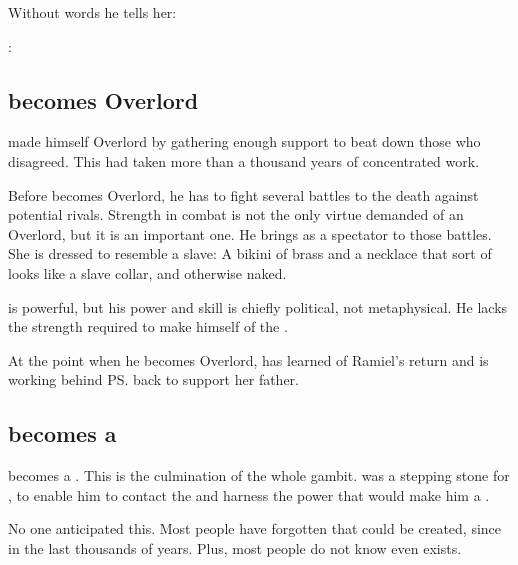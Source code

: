 Without words he tells her: 
\begin{prose}
  \Dasteron: 
\end{prose}










\subsection{\Dasteron{} becomes Overlord}
\Dasteron{} made himself Overlord by gathering enough support to beat down those who disagreed. 
This had taken more than a thousand years of concentrated work. 

Before \Dasteron becomes Overlord, he has to fight several battles to the death against potential rivals.
Strength in combat is not the only virtue demanded of an Overlord, but it is an important one.
He brings \Cishiel as a spectator to those battles. 
She is dressed to resemble a slave: 
A bikini of brass and a necklace that sort of looks like a slave collar, and otherwise naked.

\Dasteron is powerful, but his power and skill is chiefly political, not metaphysical. 
He lacks the \vertex{} strength required to make himself \apex{} of the \Mystraacht{} \matrix. 

At the point when he becomes Overlord, \Cishiel{} has learned of Ramiel's return and is working behind \ps{\Dasteron} back to support her father. 









\subsection{\Vizsherioch{} becomes a \shaeeroth}
\Vizsherioch{} becomes a \shaeeroth.
This is the culmination of the whole \Nithdornazsh{} gambit. 
\Nithdornazsh{} was a stepping stone for \Vizsherioch, to enable him to contact the \xss{} and harness the power that would make him a \shaeeroth.

No one anticipated this. 
Most people have forgotten that \shaeeroth{} could be created, since  in the last thousands of years. 
Plus, most people do not know \Vizsherioch{} even exists. 

